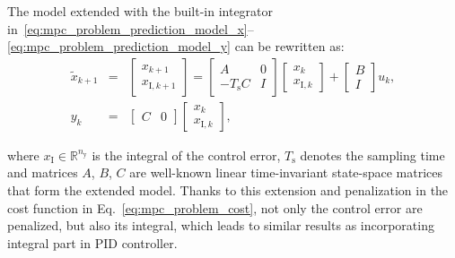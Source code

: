 \documentclass[preprint,12pt]{elsarticle}
\begin{document}
The model extended with the built-in integrator in~\eqref{eq:mpc_problem_prediction_model_x}--\eqref{eq:mpc_problem_prediction_model_y} can be rewritten as:
\begin{subequations}
	\begin{eqnarray} 
		\label{eq:mpc_extended_model_x} 
		\widetilde{x}_{k+1} &=& \begin{bmatrix} x_{k+1} \\ 	x_{\mathrm{I},k+1}\end{bmatrix} = \begin{bmatrix} A & \textit{0} \\ -T_\mathrm{s} C & I \end{bmatrix} \begin{bmatrix} x_{k} \\ x_{\mathrm{I},k} \end{bmatrix} + \begin{bmatrix} B \\ I \end{bmatrix} u_{k}, \\
		\label{eq:mpc_extended_model_y}
		y_k &=& \begin{bmatrix} C & \textit{0} \end{bmatrix} \begin{bmatrix} x_{k} \\ x_{\mathrm{I},k} \end{bmatrix},
	\end{eqnarray}
\end{subequations}

where $x_{\mathrm{I}} \in \mathbb{R}^{n_{\mathrm{y}}}$ is the integral of the control error, $T_\mathrm{s}$ denotes the sampling time and matrices $A$, $B$, $C$ are well-known linear time-invariant state-space matrices that form the extended model. Thanks to this extension and penalization in the cost function in Eq.~\eqref{eq:mpc_problem_cost}, not only the control error are penalized, but also its integral, which leads to similar results as incorporating integral part in PID controller.
\end{document}
